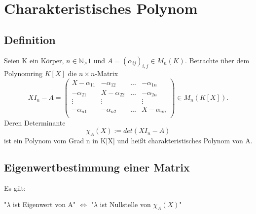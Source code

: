 
\section{Charakteristisches Polynom}
\subsection{Definition}
Seien K ein Körper, $n\in \mathbb{N}_\geq1$ und $A=(\alpha_{ij})_{i,j} \in M_n(K)$. Betrachte über dem Polynomring
$K[X]$ die $n \times n$-Matrix
\[
    XI_n-A=\begin{pmatrix}
               X-\alpha_{11}&-\alpha_{12}&\dots&-\alpha_{1n}\\
               -\alpha_{21}&X-\alpha_{22}&\dots&-\alpha_{2n}\\
               \vdots&\vdots&&\vdots\\
               -\alpha_{n1}&-\alpha_{n2}&\dots&X-\alpha_{nn}\\
    \end{pmatrix} \in M_n(K[X]).
\]
Deren Determinante
\[\chi_A(X):=det(XI_n-A)\]
ist ein Polynom vom Grad n in K[X] und heißt charakteristisches Polynom von A.

\subsection{Eigenwertbestimmung einer Matrix}
Es gilt:

"$\lambda$ ist Eigenwert von A" $\Leftrightarrow$ "$\lambda$ ist Nullstelle von $\chi_A(X)$"